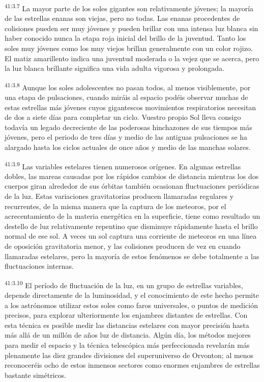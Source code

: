 \par
\textsuperscript{41:3.7} La mayor parte de los soles gigantes son relativamente jóvenes; la mayoría de las estrellas enanas son viejas, pero no todas. Las enanas procedentes de colisiones pueden ser muy jóvenes y pueden brillar con una intensa luz blanca sin haber conocido nunca la etapa roja inicial del brillo de la juventud. Tanto los soles muy jóvenes como los muy viejos brillan generalmente con un color rojizo. El matiz amarillento indica una juventud moderada o la vejez que se acerca, pero la luz blanca brillante significa una vida adulta vigorosa y prolongada.

\par
\textsuperscript{41:3.8} Aunque los soles adolescentes no pasan todos, al menos visiblemente, por una etapa de pulsaciones, cuando miráis al espacio podéis observar muchas de estas estrellas más jóvenes cuyos gigantescos movimientos respiratorios necesitan de dos a siete días para completar un ciclo. Vuestro propio Sol lleva consigo todavía un legado decreciente de las poderosas hinchazones de sus tiempos más jóvenes, pero el periodo de tres días y medio de las antiguas pulsaciones se ha alargado hasta los ciclos actuales de once años y medio de las manchas solares.

\par
\textsuperscript{41:3.9} Las variables estelares tienen numerosos orígenes. En algunas estrellas dobles, las mareas causadas por los rápidos cambios de distancia mientras los dos cuerpos giran alrededor de sus órbitas también ocasionan fluctuaciones periódicas de la luz. Estas variaciones gravitatorias producen llamaradas regulares y recurrentes, de la misma manera que la captura de los meteoros, por el acrecentamiento de la materia energética en la superficie, tiene como resultado un destello de luz relativamente repentino que disminuye rápidamente hasta el brillo normal de ese sol. A veces un sol captura una corriente de meteoros en una línea de oposición gravitatoria menor, y las colisiones producen de vez en cuando llamaradas estelares, pero la mayoría de estos fenómenos se debe totalmente a las fluctuaciones internas.

\par
\textsuperscript{41:3.10} El período de fluctuación de la luz, en un grupo de estrellas variables, depende directamente de la luminosidad, y el conocimiento de este hecho permite a los astrónomos utilizar estos soles como faros universales, o puntos de medición precisos, para explorar ulteriormente los enjambres distantes de estrellas. Con esta técnica es posible medir las distancias estelares con mayor precisión hasta más allá de un millón de años luz de distancia. Algún día, los métodos mejores para medir el espacio y la técnica telescópica más perfeccionada revelarán más plenamente las diez grandes divisiones del superuniverso de Orvonton; al menos reconoceréis ocho de estos inmensos sectores como enormes enjambres de estrellas bastante simétricos.

